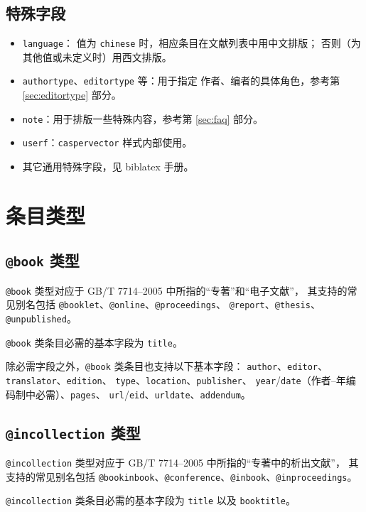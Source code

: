 \documentclass[UTF8]{ctexart}
\newcommand*{\cupercite}[1]{\supercite{#1}\mbox{}}
\begin{document}
\subsection{特殊字段}

\begin{itemize}
	\item \verb|language|：
		值为 \verb|chinese| 时，相应条目在文献列表中用中文排版；
		否则（为其他值或未定义时）用西文排版。
	\item \verb|authortype|、\verb|editortype| 等：用于指定
		作者、编者的具体角色，参考第 \ref{sec:editortype} 部分。
	\item \verb|note|：用于排版一些特殊内容，参考第 \ref{sec:faq} 部分。
	\item \verb|userf|：\verb|caspervector| 样式内部使用。
	\item 其它通用特殊字段，见 biblatex 手册\cupercite{biblatex}。
\end{itemize}

\section{条目类型}\label{sec:entries}
\subsection{\texttt{@book} 类型}

\verb|@book| 类型对应于 GB/T 7714--2005 中所指的“专著”和“电子文献”，
其支持的常见别名包括 \verb|@booklet|、\verb|@online|、\verb|@proceedings|、%
\verb|@report|、\verb|@thesis|、\verb|@unpublished|。

\verb|@book| 类条目必需的基本字段为 \verb|title|。

除必需字段之外，\verb|@book| 类条目也支持以下基本字段：%
\verb|author|、\verb|editor|、\verb|translator|、\verb|edition|、%
\verb|type|、\verb|location|、\verb|publisher|、%
\verb|year|/\verb|date|（作者--年编码制中必需）、\verb|pages|、%
\verb|url|/\verb|eid|、\verb|urldate|、\verb|addendum|。

\subsection{\texttt{@incollection} 类型}

\verb|@incollection| 类型对应于 GB/T 7714--2005 中所指的“专著中的析出文献”，
其支持的常见别名包括
\verb|@bookinbook|、\verb|@conference|、\verb|@inbook|、\verb|@inproceedings|。

\verb|@incollection| 类条目必需的基本字段为 \verb|title| 以及 \verb|booktitle|。
\end{document}

